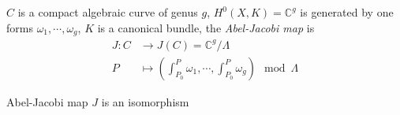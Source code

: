 \documentclass[main]{subfiles}
\begin{document}
\begin{definition}
$C$ is a compact algebraic curve of genus $g$, $H^0(X,K)=\mathbb C^g$ is generated by one forms $\omega_1,\cdots,\omega_g$, $K$ is a canonical bundle, the \textit{Abel-Jacobi map} is
\begin{align*}
J:C&\to J(C)=\mathbb C^g/\Lambda \\
P&\mapsto \left(\int_{P_0}^P\omega_1,\cdots,\int_{P_0}^P\omega_g\right)\mod\Lambda
\end{align*}
\end{definition}

\begin{theorem}
Abel-Jacobi map $J$ is an isomorphism
\end{theorem}
\end{document}
